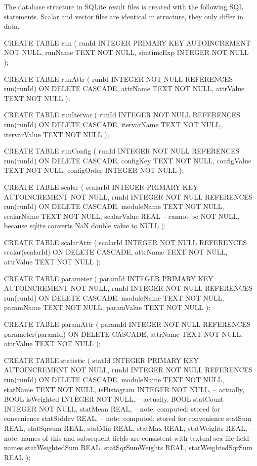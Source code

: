 The database structure in SQLite result files is created with the
following SQL statements. Scalar and vector files are identical in
structure, they only differ in data.


\begin{filelisting}
CREATE TABLE run
(
    runId       INTEGER PRIMARY KEY AUTOINCREMENT NOT NULL,
    runName     TEXT NOT NULL,
    simtimeExp  INTEGER NOT NULL
);

CREATE TABLE runAttr
(
    runId       INTEGER  NOT NULL REFERENCES run(runId) ON DELETE CASCADE,
    attrName    TEXT NOT NULL,
    attrValue   TEXT NOT NULL
);

CREATE TABLE runItervar
(
    runId       INTEGER  NOT NULL REFERENCES run(runId) ON DELETE CASCADE,
    itervarName TEXT NOT NULL,
    itervarValue TEXT NOT NULL
);

CREATE TABLE runConfig
(
    runId       INTEGER NOT NULL REFERENCES run(runId) ON DELETE CASCADE,
    configKey   TEXT NOT NULL,
    configValue TEXT NOT NULL,
    configOrder INTEGER NOT NULL
);

CREATE TABLE scalar
(
    scalarId      INTEGER PRIMARY KEY AUTOINCREMENT NOT NULL,
    runId         INTEGER  NOT NULL REFERENCES run(runId) ON DELETE CASCADE,
    moduleName    TEXT NOT NULL,
    scalarName    TEXT NOT NULL,
    scalarValue   REAL        -- cannot be NOT NULL, because sqlite converts NaN double value to NULL
);

CREATE TABLE scalarAttr
(
    scalarId      INTEGER  NOT NULL REFERENCES scalar(scalarId) ON DELETE CASCADE,
    attrName      TEXT NOT NULL,
    attrValue     TEXT NOT NULL
);

CREATE TABLE parameter
(
    paramId       INTEGER PRIMARY KEY AUTOINCREMENT NOT NULL,
    runId         INTEGER  NOT NULL REFERENCES run(runId) ON DELETE CASCADE,
    moduleName    TEXT NOT NULL,
    paramName     TEXT NOT NULL,
    paramValue    TEXT NOT NULL
);

CREATE TABLE paramAttr
(
    paramId       INTEGER  NOT NULL REFERENCES parameter(paramId) ON DELETE CASCADE,
    attrName      TEXT NOT NULL,
    attrValue     TEXT NOT NULL
);

CREATE TABLE statistic
(
    statId        INTEGER PRIMARY KEY AUTOINCREMENT NOT NULL,
    runId         INTEGER NOT NULL REFERENCES run(runId) ON DELETE CASCADE,
    moduleName    TEXT NOT NULL,
    statName      TEXT NOT NULL,
    isHistogram   INTEGER NOT NULL,   -- actually, BOOL
    isWeighted    INTEGER NOT NULL,   -- actually, BOOL
    statCount     INTEGER NOT NULL,
    statMean      REAL,   -- note: computed; stored for convenience
    statStddev    REAL,   -- note: computed; stored for convenience
    statSum       REAL,
    statSqrsum    REAL,
    statMin       REAL,
    statMax       REAL,
    statWeights          REAL,  -- note: names of this and subsequent fields are consistent with textual sca file field names
    statWeightedSum      REAL,
    statSqrSumWeights    REAL,
    statWeightedSqrSum   REAL
);


\end{filelisting}
